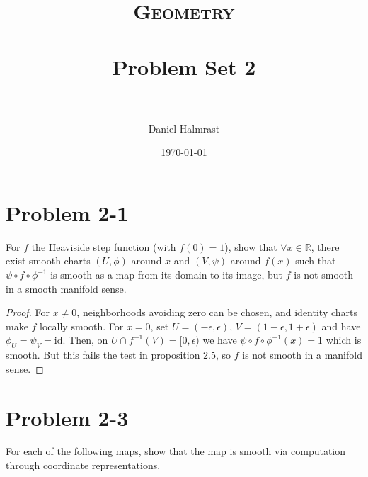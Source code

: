 \documentclass[fontsize=11pt]{scrartcl} %
\title{	
\normalfont \normalsize 
\textsc{Geometry} \\ [25pt] %
\horrule{0.5pt} \\[0.4cm] %
\huge Problem Set 2\\ %
\horrule{2pt} \\[0.5cm] %
}
\author{Daniel Halmrast} %
\date{\normalsize\today} %
\numberwithin{equation}{section} %
\numberwithin{figure}{section} %
\numberwithin{table}{section} %
\newcommand{\R}{\mathbb{R}}
\begin{document}
\maketitle %

\section*{Problem 2-1}
For $f$ the Heaviside step function (with $f(0)=1$), show that $\forall x \in\R$, there
exist smooth charts $(U,\phi)$ around $x$ and $(V,\psi)$ around $f(x)$ such that 
$\psi\circ f\circ\phi^{-1}$ is smooth as a map from its domain to its image, but $f$ is not
smooth in a smooth manifold sense.
\\
\begin{proof}
For $x\neq 0$, neighborhoods avoiding zero can be chosen, and identity charts make $f$
locally smooth. For $x=0$, set $U = (-\epsilon,\epsilon)$, $V = (1-\epsilon,1+\epsilon)$
and have $\phi_U = \psi_V = \textrm{id}$.
Then, on $U\cap f^{-1}(V) = [0,\epsilon)$ we have $\psi\circ f\circ\phi^{-1}(x) = 1$
which is smooth. But this fails the test in proposition 2.5, so $f$ is not smooth in a
manifold sense.
\end{proof}

\section*{Problem 2-3}
For each of the following maps, show that the map is smooth via computation through coordinate
representations.
\end{document}
